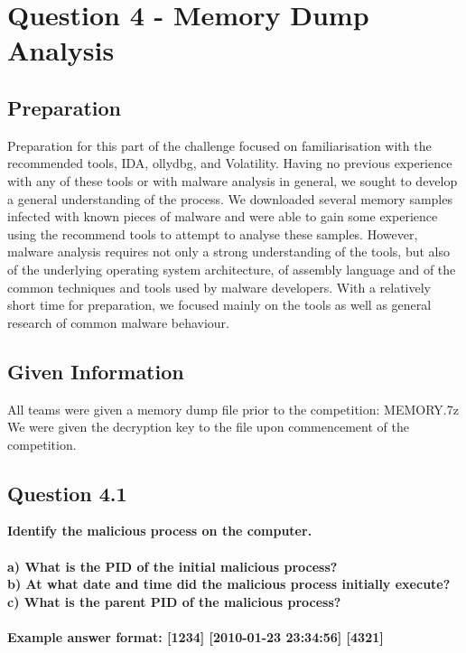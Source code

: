 \lstset{basicstyle=\tiny}

\chapter{Question 4 - Memory Dump Analysis}

\section{Preparation}
Preparation for this part of the challenge focused on familiarisation with the recommended tools, IDA, ollydbg, and Volatility. Having no previous experience with any of these tools or with malware analysis in general, we sought to develop a general understanding of the process. We downloaded several memory samples infected with known pieces of malware and were able to gain some experience using the recommend tools to attempt to analyse these samples. However, malware analysis requires not only a strong understanding of the tools, but also of the underlying operating system architecture, of assembly language and of the common techniques and tools used by malware developers. With a relatively short time for preparation, we focused mainly on the tools as well as general research of common malware behaviour. 

\section{Given Information}
All teams were given a memory dump file prior to the competition: MEMORY.7z\\
We were given the decryption key to the file upon commencement of the
competition.

\section{Question 4.1}
\textbf{Identify the malicious process on the computer.
\\\\
a) What is the PID of the initial malicious process?
\\b) At what date and time did the malicious process initially execute?
\\c) What is the parent PID of the malicious process?
\\\\
Example answer format: [1234] [2010-01-23 23:34:56] [4321]}
